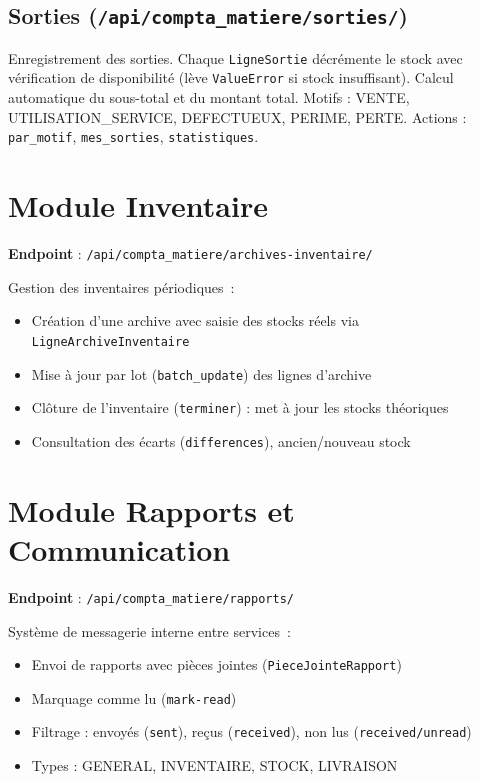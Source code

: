 \documentclass[12pt,a4paper]{report}
\begin{document}
\subsection{Sorties (\texttt{/api/compta\_matiere/sorties/})}
Enregistrement des sorties. Chaque \texttt{LigneSortie} décrémente le stock avec vérification de disponibilité (lève \texttt{ValueError} si stock insuffisant). Calcul automatique du sous-total et du montant total.
Motifs : VENTE, UTILISATION\_SERVICE, DEFECTUEUX, PERIME, PERTE.
Actions : \texttt{par\_motif}, \texttt{mes\_sorties}, \texttt{statistiques}.

\section{Module Inventaire}
\textbf{Endpoint} : \texttt{/api/compta\_matiere/archives-inventaire/}

Gestion des inventaires périodiques~:
\begin{itemize}
    \item Création d'une archive avec saisie des stocks réels via \texttt{LigneArchiveInventaire}
    \item Mise à jour par lot (\texttt{batch\_update}) des lignes d'archive
    \item Clôture de l'inventaire (\texttt{terminer}) : met à jour les stocks théoriques
    \item Consultation des écarts (\texttt{differences}), ancien/nouveau stock
\end{itemize}

\section{Module Rapports et Communication}
\textbf{Endpoint} : \texttt{/api/compta\_matiere/rapports/}

Système de messagerie interne entre services~:
\begin{itemize}
    \item Envoi de rapports avec pièces jointes (\texttt{PieceJointeRapport})
    \item Marquage comme lu (\texttt{mark-read})
    \item Filtrage : envoyés (\texttt{sent}), reçus (\texttt{received}), non lus (\texttt{received/unread})
    \item Types : GENERAL, INVENTAIRE, STOCK, LIVRAISON
\end{itemize}
\end{document}
